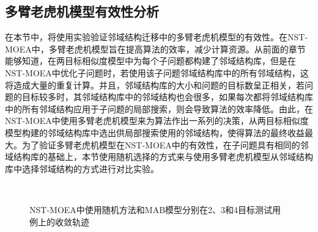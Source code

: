 \subsection{多臂老虎机模型有效性分析}
\label{subsec:NST:实验与讨论:多臂老虎机模型有效性分析}
在本节中，将使用实验验证邻域结构迁移中的多臂老虎机模型的有效性。在NST-MOEA中，多臂老虎机模型旨在提高算法的效率，减少计算资源。从前面的章节能够知道，在两目标相似度模型中为每个子问题都构建了邻域结构库，但是在NST-MOEA中优化子问题时，若使用该子问题邻域结构库中的所有邻域结构，这将造成大量的重复计算。并且，邻域结构库的大小和问题的目标数呈正相关，若问题的目标较多时，其邻域结构库中的邻域结构也会很多，如果每次都将邻域结构库中的所有邻域结构应用于子问题的局部搜索，则会导致算法的效率降低。由此，在NST-MOEA中使用多臂老虎机模型来为算法作出一系列的决策，从两目标相似度模型构建的邻域结构库中选出供局部搜索使用的邻域结构，使得算法的最终收益最大。为了验证多臂老虎机模型在NST-MOEA中的有效性，在子问题具有相同的邻域结构库的基础上，本节使用随机选择的方式来与使用多臂老虎机模型从邻域结构库中选择邻域结构的方式进行对比实验。
\begin{figure}[!h]
     \quad
    \\
     \quad
    \caption[NST-MOEA中使用随机方法和MAB模型分别在2、3和4目标测试用例上的收敛轨迹]{NST-MOEA中使用随机方法和MAB模型分别在2、3和4目标测试用例上的收敛轨迹}
    \label{fig:NST-MOEA中使用随机方法和MAB模型分别在2、3和4目标测试用例上的收敛轨迹}
\end{figure}
